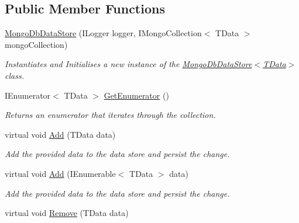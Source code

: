 \subsection*{Public Member Functions}
\begin{DoxyCompactItemize}
\item 
\hyperlink{classCqrs_1_1MongoDB_1_1DataStores_1_1MongoDbDataStore_a039b75f6f011fa89b5dd724bee6b64cb_a039b75f6f011fa89b5dd724bee6b64cb}{Mongo\+Db\+Data\+Store} (I\+Logger logger, I\+Mongo\+Collection$<$ T\+Data $>$ mongo\+Collection)
\begin{DoxyCompactList}\small\item\em Instantiates and Initialises a new instance of the \hyperlink{classCqrs_1_1MongoDB_1_1DataStores_1_1MongoDbDataStore_a039b75f6f011fa89b5dd724bee6b64cb_a039b75f6f011fa89b5dd724bee6b64cb}{Mongo\+Db\+Data\+Store$<$\+T\+Data$>$} class. \end{DoxyCompactList}\item 
I\+Enumerator$<$ T\+Data $>$ \hyperlink{classCqrs_1_1MongoDB_1_1DataStores_1_1MongoDbDataStore_a2bab987d4d7f3c6b2ab3a3e04878cf98_a2bab987d4d7f3c6b2ab3a3e04878cf98}{Get\+Enumerator} ()
\begin{DoxyCompactList}\small\item\em Returns an enumerator that iterates through the collection. \end{DoxyCompactList}\item 
virtual void \hyperlink{classCqrs_1_1MongoDB_1_1DataStores_1_1MongoDbDataStore_affcb1268469b99963501dd8c58e4a480_affcb1268469b99963501dd8c58e4a480}{Add} (T\+Data data)
\begin{DoxyCompactList}\small\item\em Add the provided {\itshape data}  to the data store and persist the change. \end{DoxyCompactList}\item 
virtual void \hyperlink{classCqrs_1_1MongoDB_1_1DataStores_1_1MongoDbDataStore_a709fc1e29d266a7c19a46bd181d03963_a709fc1e29d266a7c19a46bd181d03963}{Add} (I\+Enumerable$<$ T\+Data $>$ data)
\begin{DoxyCompactList}\small\item\em Add the provided {\itshape data}  to the data store and persist the change. \end{DoxyCompactList}\item 
virtual void \hyperlink{classCqrs_1_1MongoDB_1_1DataStores_1_1MongoDbDataStore_a14b43546e8d1e1832358e1cf2f8535f1_a14b43546e8d1e1832358e1cf2f8535f1}{Remove} (T\+Data data)

\end{DoxyCompactItemize}
